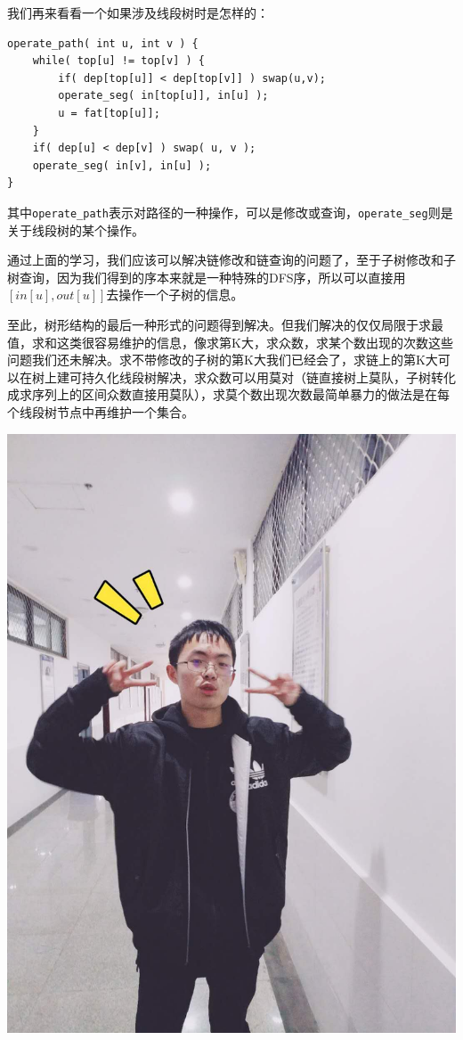 \documentclass{beamer}
\begin{document}
		\begin{frame}[fragile=singleslide]
			我们再来看看一个如果涉及线段树时是怎样的：
			\begin{verbatim}
operate_path( int u, int v ) {
    while( top[u] != top[v] ) {
        if( dep[top[u]] < dep[top[v]] ) swap(u,v);
        operate_seg( in[top[u]], in[u] );
        u = fat[top[u]];
    }
    if( dep[u] < dep[v] ) swap( u, v );
    operate_seg( in[v], in[u] );
}
			\end{verbatim}
			
			其中\texttt{operate\_path}表示对路径的一种操作，可以是修改或查询，\texttt{operate\_seg}则是关于线段树的某个操作。
		\end{frame}
		\begin{frame}
			通过上面的学习，我们应该可以解决链修改和链查询的问题了，至于子树修改和子树查询，因为我们得到的序本来就是一种特殊的DFS序，所以可以直接用$[in[u],out[u]]$去操作一个子树的信息。
			
			至此，树形结构的最后一种形式的问题得到解决。但我们解决的仅仅局限于求最值，求和这类很容易维护的信息，像求第K大，求众数，求某个数出现的次数这些问题我们还未解决。求不带修改的子树的第K大我们已经会了，求链上的第K大可以在树上建可持久化线段树解决，求众数可以用莫对（链直接树上莫队，子树转化成求序列上的区间众数直接用莫队），求莫个数出现次数最简单暴力的做法是在每个线段树节点中再维护一个集合。
		\end{frame}
		\begin{frame}
			\includegraphics[scale=0.23]{pic.jpg}
		\end{frame}
\end{document}

